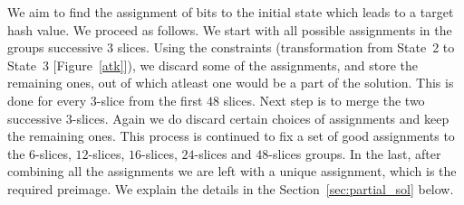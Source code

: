  We aim to find the assignment of bits to the initial state which leads to a target hash value. We proceed as follows. We start with all possible assignments in the groups successive $3$ slices. Using the constraints (transformation from State~2 to State~3 [Figure~\ref{atk}]), we discard some of the assignments, and store the remaining ones, out of which atleast one would be a part of the solution. This is done for every $3$-slice from the first $48$ slices. Next step is to merge the two successive $3$-slices. Again we do discard certain choices of assignments and keep the remaining ones. This process is continued to fix a set of good assignments to the $6$-slices, $12$-slices, $16$-slices, $24$-slices and $48$-slices groups. In the last, after combining all the assignments we are left with a unique assignment, which is the required preimage. We explain the details in the Section~\ref{sec:partial_sol} below. 

